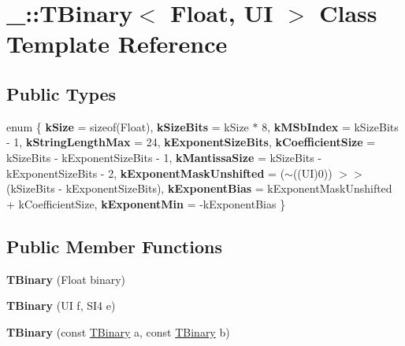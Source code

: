 \hypertarget{class___1_1_t_binary}{}\section{\+\_\+\+:\+:T\+Binary$<$ Float, UI $>$ Class Template Reference}
\label{class___1_1_t_binary}
\subsection*{Public Types}
\begin{DoxyCompactItemize}
\item 
\mbox{\label{class___1_1_t_binary_af5a08d4a78e453bf384ff85e4aac2118}} 
enum \{ \newline
{\bfseries k\+Size} = sizeof(Float), 
{\bfseries k\+Size\+Bits} = k\+Size $\ast$ 8, 
{\bfseries k\+M\+Sb\+Index} = k\+Size\+Bits -\/ 1, 
{\bfseries k\+String\+Length\+Max} = 24, 
\newline
{\bfseries k\+Exponent\+Size\+Bits}, 
{\bfseries k\+Coefficient\+Size} = k\+Size\+Bits -\/ k\+Exponent\+Size\+Bits -\/ 1, 
{\bfseries k\+Mantissa\+Size} = k\+Size\+Bits -\/ k\+Exponent\+Size\+Bits -\/ 2, 
{\bfseries k\+Exponent\+Mask\+Unshifted} = ($\sim$((UI)0)) $>$$>$ (k\+Size\+Bits -\/ k\+Exponent\+Size\+Bits), 
\newline
{\bfseries k\+Exponent\+Bias} = k\+Exponent\+Mask\+Unshifted + k\+Coefficient\+Size, 
{\bfseries k\+Exponent\+Min} = -\/k\+Exponent\+Bias
 \}
\end{DoxyCompactItemize}
\subsection*{Public Member Functions}
\begin{DoxyCompactItemize}
\item 
\mbox{\label{class___1_1_t_binary_a55a35e15c413d2f9db4e6c454e39c8c4}} 
{\bfseries T\+Binary} (Float binary)
\item 
\mbox{\label{class___1_1_t_binary_a2344024a8ad45fc1894de16bebcda229}} 
{\bfseries T\+Binary} (UI f, S\+I4 e)
\item 
\mbox{\label{class___1_1_t_binary_a8198a43d80a948ba714c9730aef78983}} 
{\bfseries T\+Binary} (const \mbox{\hyperlink{class___1_1_t_binary}{T\+Binary}} a, const \mbox{\hyperlink{class___1_1_t_binary}{T\+Binary}} b)
\end{DoxyCompactItemize}
